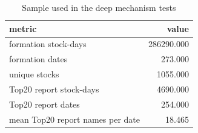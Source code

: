 \begin{table}[!htbp]\centering
\caption{Sample used in the deep mechanism tests}
\label{tab:deep_sample}
\begin{tabular}{lr}
\toprule
metric & value \\
\midrule
formation stock-days & 286290.000 \\
formation dates & 273.000 \\
unique stocks & 1055.000 \\
Top20 report stock-days & 4690.000 \\
Top20 report dates & 254.000 \\
mean Top20 report names per date & 18.465 \\
\bottomrule
\end{tabular}
\end{table}
